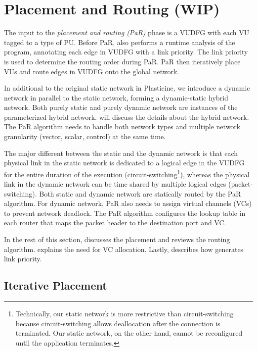\section{Placement and Routing (WIP)} \label{sec:par}
The input to the \emph{placement and routing (PaR)} phase is a VUDFG with each VU tagged to a type of PU.
Before PaR, \name also performs a runtime analysis of the program, annotating each edge in VUDFG
with a link priority. The link priority is used to determine the routing order during PaR.
PaR then iteratively place VUs and route edges in VUDFG onto the global network.

In additional to the original static network in Plasticine, we introduce a dynamic network in
parallel to the static network, forming a dynamic-static hybrid network.
Both purely static and purely dynamic network are instances of the parameterized hybrid network.
 will discuss the details about the hybrid network.
The PaR algorithm needs to handle both network types and multiple network granularity (vector,
scalar, control) at the same time.

The major different between the static and the dynamic network is that each physical link in the static
network is dedicated to a logical edge in the VUDFG for the entire duration of the execution
(circuit-switching\footnote{Technically, our static network is more restrictive than
circuit-switching because circuit-switching allows deallocation after the connection is terminated.
Our static network, on the other hand, cannot be reconfigured until the application terminates.}), whereas 
the physical link in the dynamic network can be time shared by multiple logical edges
(packet-switching).
Both static and dynamic network are statically routed by the PaR algorithm. 
For dynamic network, PaR also needs to assign virtual channels (VCs) to prevent network deadlock.
The PaR algorithm configures the lookup table in each router that maps the packet header to the
destination port and VC.

In the rest of this section,  discusses the placement and 
reviews the routing algorithm.  explains the need for VC allocation. Lastly,
 describes how \name generates link priority.

\subsection{Iterative Placement} \label{sec:place}

